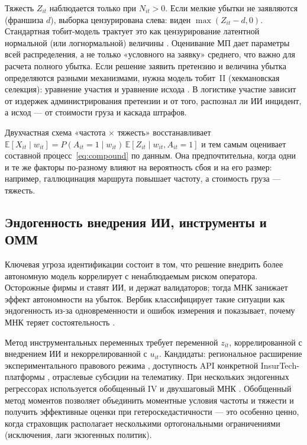 \documentclass[a4paper,14pt]{extarticle}
\begin{document}
Тяжесть $Z_{it}$ наблюдается только при $N_{it}>0$. Если мелкие убытки не заявляются (франшиза $d$), выборка цензурирована слева: виден $\max(Z_{it}-d,0)$. Стандартная тобит-модель трактует это как цензурирование латентной нормальной (или логнормальной) величины \cite{verbeek}. Оценивание МП дает параметры всей распределения, а не только «условного на заявку» среднего, что важно для расчета полного убытка. Если решение заявить претензию и величина убытка определяются разными механизмами, нужна модель тобит~II (хекмановская селекция): уравнение участия и уравнение исхода \cite{verbeek}. В логистике участие зависит от издержек администрирования претензии и от того, распознал ли ИИ инцидент, а исход --- от стоимости груза и каскада штрафов.

Двухчастная схема «частота $\times$ тяжесть» восстанавливает $\mathbb{E}[X_{it}\mid w_{it}]=P(A_{it}=1\mid w_{it})\,\mathbb{E}[Z_{it}\mid w_{it}, A_{it}=1]$ и тем самым оценивает составной процесс~\eqref{eq:compound} по данным. Она предпочтительна, когда одни и те же факторы по-разному влияют на вероятность сбоя и на его размер: например, галлюцинация маршрута повышает частоту, а стоимость груза --- тяжесть.

\subsection{Эндогенность внедрения ИИ, инструменты и ОММ}

Ключевая угроза идентификации состоит в том, что решение внедрить более автономную модель коррелирует с ненаблюдаемым риском оператора. Осторожные фирмы и ставят ИИ, и держат валидаторов; тогда МНК занижает эффект автономности на убыток. Вербик классифицирует такие ситуации как эндогенность из-за одновременности и ошибок измерения и показывает, почему МНК теряет состоятельность \cite{verbeek}.

Метод инструментальных переменных требует переменной $z_{it}$, коррелированной с внедрением ИИ и некоррелированной с $u_{it}$. Кандидаты: региональное расширение экспериментального правового режима \cite{fz169}, доступность API конкретной InsurTech-платформы \cite{insurtech}, отраслевые субсидии на телематику. При нескольких эндогенных регрессорах используется обобщенный IV и двухшаговый МНК \cite{verbeek}. Обобщенный метод моментов позволяет объединить моментные условия частоты и тяжести и получить эффективные оценки при гетероскедастичности --- это особенно ценно, когда страховщик располагает несколькими ортогональными ограничениями (исключения, лаги экзогенных политик).
\end{document}
